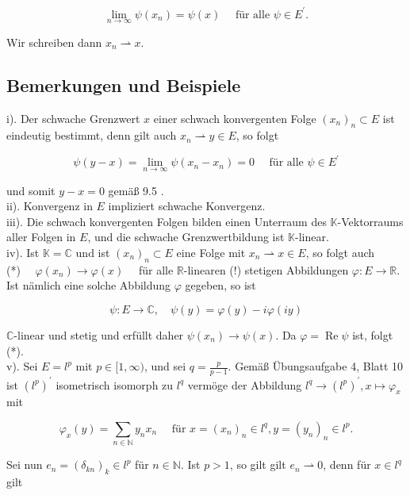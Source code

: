 \documentclass[10pt, letterpaper]{article}
\begin{document}
$$
\lim _{n \rightarrow \infty} \psi\left(x_{n}\right)=\psi(x) \quad \text { für alle } \psi \in E^{\prime} .
$$

Wir schreiben dann $x_{n} \rightharpoonup x$.

\subsection*{Bemerkungen und Beispiele}
i). Der schwache Grenzwert $x$ einer schwach konvergenten Folge $\left(x_{n}\right)_{n} \subset E$ ist eindeutig bestimmt, denn gilt auch $x_{n} \rightharpoonup y \in E$, so folgt

$$
\psi(y-x)=\lim _{n \rightarrow \infty} \psi\left(x_{n}-x_{n}\right)=0 \quad \text { für alle } \psi \in E^{\prime}
$$

und somit $y-x=0$ gemäß 9.5 .\\
ii). Konvergenz in $E$ impliziert schwache Konvergenz.\\
iii). Die schwach konvergenten Folgen bilden einen Unterraum des $\mathbb{K}$-Vektorraums aller Folgen in $E$, und die schwache Grenzwertbildung ist $\mathbb{K}$-linear.\\
iv). Ist $\mathbb{K}=\mathbb{C}$ und ist $\left(x_{n}\right)_{n} \subset E$ eine Folge mit $x_{n} \rightharpoonup x \in E$, so folgt auch\\
(*) $\quad \varphi\left(x_{n}\right) \rightarrow \varphi(x) \quad$ für alle $\mathbb{R}$-linearen (!) stetigen Abbildungen $\varphi: E \rightarrow \mathbb{R}$.\\
Ist nämlich eine solche Abbildung $\varphi$ gegeben, so ist

$$
\psi: E \rightarrow \mathbb{C}, \quad \psi(y)=\varphi(y)-i \varphi(i y)
$$

$\mathbb{C}$-linear und stetig und erfüllt daher $\psi\left(x_{n}\right) \rightarrow \psi(x)$. Da $\varphi=\operatorname{Re} \psi$ ist, folgt (*).\\
v). Sei $E=l^{p}$ mit $p \in[1, \infty)$, und sei $q=\frac{p}{p-1}$. Gemäß Übungsaufgabe 4, Blatt 10 ist $\left(l^{p}\right)^{\prime}$ isometrisch isomorph zu $l^{q}$ vermöge der Abbildung $l^{q} \rightarrow\left(l^{p}\right)^{\prime}, x \mapsto \varphi_{x}$ mit

$$
\varphi_{x}(y)=\sum_{n \in \mathbb{N}} y_{n} x_{n} \quad \text { für } x=\left(x_{n}\right)_{n} \in l^{q}, y=\left(y_{n}\right)_{n} \in l^{p} .
$$

Sei nun $e_{n}=\left(\delta_{k n}\right)_{k} \in l^{p}$ für $n \in \mathbb{N}$. Ist $p>1$, so gilt gilt $e_{n} \rightharpoonup 0$, denn für $x \in l^{q}$ gilt
\end{document}

